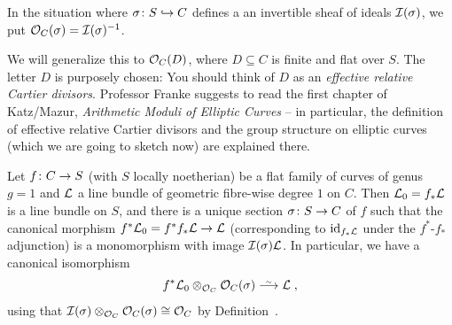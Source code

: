 \documentclass[a4paper,parskip=half,numbers=enddot, DIV=12]{scrreprt}
\begin{document}
\begin{defi}
	In the situation where $\sigma\colon S\monomorphism C$ defines a an invertible sheaf of ideals $\mathcal{I}(\sigma)$, we put $\mathcal{O}_C(\sigma)=\mathcal{I}(\sigma)^{-1}$.
\end{defi}
\begin{rem}
	We will generalize this to $\mathcal{O}_C(D)$, where $D\subseteq C$ is finite and flat over $S$. The letter $D$ is purposely chosen: You should think of $D$ as an \emph{effective relative Cartier divisors}. Professor Franke suggests to read the first chapter of Katz/Mazur, \emph{Arithmetic Moduli of Elliptic Curves} \cite{katzmazur} -- in particular, the definition of effective relative Cartier divisors and the group structure on elliptic curves (which we are going to sketch now) are explained there.
\end{rem}
\begin{prop}
	Let $f\colon C\morphism S$ (with $S$ locally noetherian) be a flat family of curves of genus $g=1$ and $\mathcal{L}$ a line bundle of geometric fibre-wise degree $1$ on $C$. Then $\mathcal{L}_0=f_*\mathcal{L}$ is a line bundle on $S$, and there is a unique section $\sigma\colon S\morphism C$ of $f$ such that the canonical morphism $f^*\Ll_0=f^*f_*\Ll\morphism\Ll$ (corresponding to $\operatorname{id}_{f_*\mathcal{L}}$ under the $f^*$-$f_*$ adjunction) is a monomorphism with image $\mathcal{I}(\sigma)\mathcal{L}$. In particular, we have a canonical isomorphism
	\begin{align*}
		f^*\Ll_0\otimes_{\Oo_C}\Oo_C(\sigma)\isomorphism\Ll\;,
	\end{align*}
	using that $\mathcal{I}(\sigma)\otimes_{\mathcal{O}_C}\mathcal{O}_C(\sigma)\cong \mathcal{O}_C$ by Definition~.
\end{prop}
\end{document}
